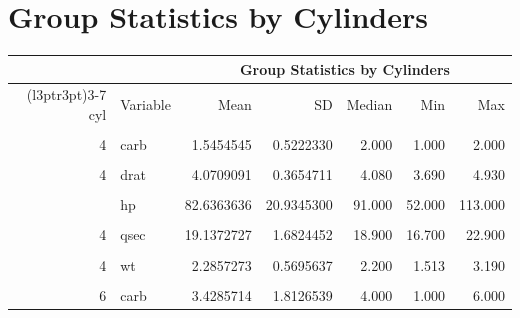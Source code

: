 \documentclass{article}
\begin{document}
\section*{Group Statistics by Cylinders}
\begin{table}[!h]
\centering
\begin{tabular}{rlrrrrr}
\toprule
\multicolumn{2}{c}{ } & \multicolumn{5}{c}{Group Statistics by Cylinders} \\
\cmidrule(l{3pt}r{3pt}){3-7}
cyl & Variable & Mean & SD & Median & Min & Max\\
\midrule
\cellcolor{gray!10}{4} & \cellcolor{gray!10}{am} & \cellcolor{gray!10}{0.7272727} & \cellcolor{gray!10}{0.4670994} & \cellcolor{gray!10}{1.000} & \cellcolor{gray!10}{0.000} & \cellcolor{gray!10}{1.000}\\
4 & carb & 1.5454545 & 0.5222330 & 2.000 & 1.000 & 2.000\\
\cellcolor{gray!10}{4} & \cellcolor{gray!10}{disp} & \cellcolor{gray!10}{105.1363636} & \cellcolor{gray!10}{26.8715937} & \cellcolor{gray!10}{108.000} & \cellcolor{gray!10}{71.100} & \cellcolor{gray!10}{146.700}\\
4 & drat & 4.0709091 & 0.3654711 & 4.080 & 3.690 & 4.930\\
\cellcolor{gray!10}{4} & \cellcolor{gray!10}{gear} & \cellcolor{gray!10}{4.0909091} & \cellcolor{gray!10}{0.5393599} & \cellcolor{gray!10}{4.000} & \cellcolor{gray!10}{3.000} & \cellcolor{gray!10}{5.000}\\
\addlinespace
4 & hp & 82.6363636 & 20.9345300 & 91.000 & 52.000 & 113.000\\
\cellcolor{gray!10}{4} & \cellcolor{gray!10}{mpg} & \cellcolor{gray!10}{26.6636364} & \cellcolor{gray!10}{4.5098277} & \cellcolor{gray!10}{26.000} & \cellcolor{gray!10}{21.400} & \cellcolor{gray!10}{33.900}\\
4 & qsec & 19.1372727 & 1.6824452 & 18.900 & 16.700 & 22.900\\
\cellcolor{gray!10}{4} & \cellcolor{gray!10}{vs} & \cellcolor{gray!10}{0.9090909} & \cellcolor{gray!10}{0.3015113} & \cellcolor{gray!10}{1.000} & \cellcolor{gray!10}{0.000} & \cellcolor{gray!10}{1.000}\\
4 & wt & 2.2857273 & 0.5695637 & 2.200 & 1.513 & 3.190\\
\addlinespace
\cellcolor{gray!10}{6} & \cellcolor{gray!10}{am} & \cellcolor{gray!10}{0.4285714} & \cellcolor{gray!10}{0.5345225} & \cellcolor{gray!10}{0.000} & \cellcolor{gray!10}{0.000} & \cellcolor{gray!10}{1.000}\\
6 & carb & 3.4285714 & 1.8126539 & 4.000 & 1.000 & 6.000\\

\end{tabular}
\end{table}
\end{document}
